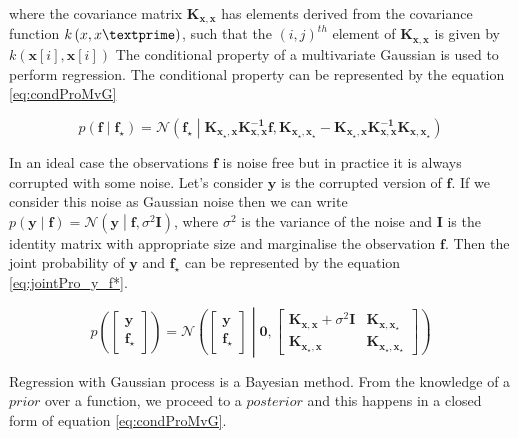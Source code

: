 where the covariance matrix $ \mathbf{K_{x,x}}$ has elements derived from the covariance function $ k \left(x,x\textprime \right)$, such that the $ \left(i,j \right)^{th}$ element of $ \mathbf{K_{x,x}}$ is given by $k \left( \mathbf{x} \left[ i\right],\mathbf{x} \left[ i\right] \right) $ The conditional property of a multivariate Gaussian is used to perform regression. The conditional property can be represented by the equation \ref{eq:condProMvG}

\begin{equation} \label{eq:condProMvG}
p \left( \mathbf{f} \middle| \mathbf{f_\star} \right) =
\mathcal{N}\left( \mathbf{f_\star} \middle| \mathbf{K_{x_\star,x}}  \mathbf{K^{-1}_{x,x}} \mathbf{f,} \mathbf{K_{x_\star,x_\star}} - 
\mathbf{K_{x_\star,x}} \mathbf{K^{-1}_{x,x}} \mathbf{K_{x,x_\star}}\right)
\end{equation}

In an ideal case the observations $\mathbf{f}$ is noise free but in practice it is always corrupted with some noise. Let's consider $\mathbf{y}$ is the corrupted version of $\mathbf{f}$. If we consider this noise as Gaussian noise then we can write $p \left( \mathbf{y} \middle| \mathbf{f} \right) = \mathcal{N} \left( \mathbf{y} \middle| \mathbf{f}, \sigma^2 \mathbf{I} \right) $, where $ \sigma^2 $ is the variance of the noise and $\mathbf{I}$ is the identity matrix with appropriate size and marginalise the observation $\mathbf{f}$. Then the joint probability of $\mathbf{y}$ and $\mathbf{f_\star}$ can be represented by the equation \ref{eq:jointPro_y_f*}.

\begin{equation} \label{eq:jointPro_y_f*}
p \left( \begin{bmatrix} \mathbf{y} \\\mathbf{f_\star} \end{bmatrix} \right) =
\mathcal{N}\left( \begin{bmatrix} \mathbf{y} \\\mathbf{f_\star} \end{bmatrix} \middle|
\mathbf{0}, \begin{bmatrix} \mathbf{K_{x,x}}+ \sigma^2\mathbf{I} & \mathbf{K_{x,x_\star}} \\
			    \mathbf{K_{x_\star,x}} & \mathbf{K_{x_\star,x_\star}} \end{bmatrix} \right)
\end{equation}

Regression with Gaussian process is a Bayesian method. From the knowledge of a $prior$ over a function, we proceed to a $posterior$ and this happens in a closed form of equation \ref{eq:condProMvG}. 

